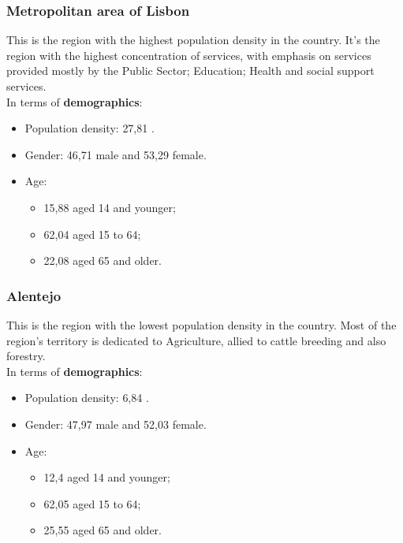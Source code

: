 \subsubsection{Metropolitan area of Lisbon }
This is the region with the highest population density in the country. It's the region with the highest concentration of services, with emphasis on services provided mostly by the Public Sector; Education; Health and social support services.\\
In terms of {\textbf{demographics}}:
    \begin{itemize}
        \item Population density: {27,81\textdiscount} . 
        \item Gender: {46,71\textdiscount} male and {53,29\textdiscount} female.
        \item Age: 
        \begin{itemize}
        \item {15,88\textdiscount} aged 14 and younger;
        \item {62,04\textdiscount} aged 15 to 64;
        \item {22,08\textdiscount} aged 65 and older.
        \end{itemize}
    \end{itemize}
    
\subsubsection{Alentejo}
This is the region with the lowest population density in the country. Most of the region's territory is dedicated to Agriculture, allied to cattle breeding and also forestry.\\
In terms of {\textbf{demographics}}:

    \begin{itemize}
        \item Population density: {6,84\textdiscount} . 
        \item Gender: {47,97\textdiscount} male and {52,03\textdiscount} female.
        \item Age: 
        \begin{itemize}
        \item {12,4\textdiscount} aged 14 and younger;
        \item {62,05\textdiscount} aged 15 to 64;
        \item {25,55\textdiscount} aged 65 and older.
        \end{itemize}
    \end{itemize}
    
